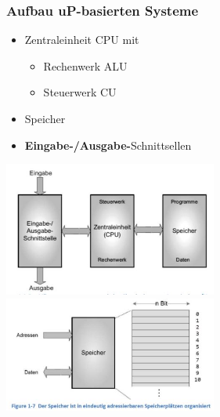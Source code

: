 \subsubsection{Aufbau uP-basierten Systeme}
\begin{itemize}
    \item Zentraleinheit CPU mit
    \begin{itemize}
        \item Rechenwerk ALU
        \item Steuerwerk CU
    \end{itemize}
    \item Speicher
    \item \textbf{Eingabe-/Ausgabe-}Schnittsellen
\end{itemize}
\includegraphics[width=7cm]{images/aufbauuC1}
\includegraphics[width=7cm]{images/aufbauuCspeicher}

